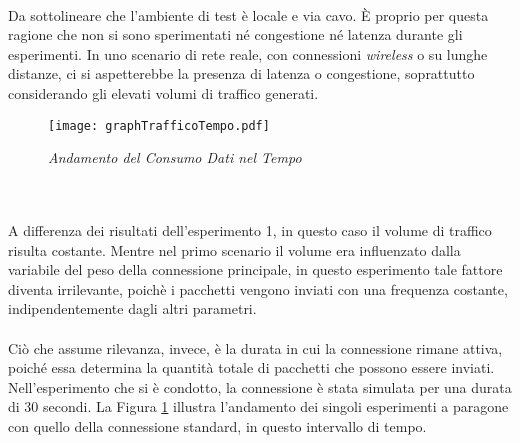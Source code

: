 \\
\noindent Da sottolineare che l'ambiente di test è locale e via cavo. È proprio per questa ragione che non si sono sperimentati né congestione né latenza durante gli esperimenti. 
In uno scenario di rete reale, con connessioni \emph{wireless} o su lunghe distanze, ci si aspetterebbe la presenza di latenza o congestione, soprattutto considerando gli elevati volumi di traffico generati. 
\begin{figure}[!h]
    \centering
        \texttt{[image: graphTrafficoTempo.pdf]}
        \caption{\emph{Andamento del Consumo Dati nel Tempo}}
        \label{grafico23}
\end{figure}
\\\\
\noindent A differenza dei risultati dell'esperimento 1, in questo caso il volume di traffico risulta costante.
Mentre nel primo scenario il volume era influenzato dalla variabile del peso della connessione principale, in questo esperimento tale fattore diventa irrilevante,
poichè i pacchetti vengono inviati con una frequenza costante, indipendentemente dagli altri parametri.
\\\\
Ciò che assume rilevanza, invece, è la durata in cui la connessione rimane attiva, poiché essa determina la quantità totale di pacchetti che possono essere inviati.
Nell'esperimento che si è condotto, la connessione è stata simulata per una durata di 30 secondi. La Figura \ref{grafico23} illustra l'andamento dei singoli esperimenti a paragone con quello della connessione standard, in questo intervallo di tempo.

